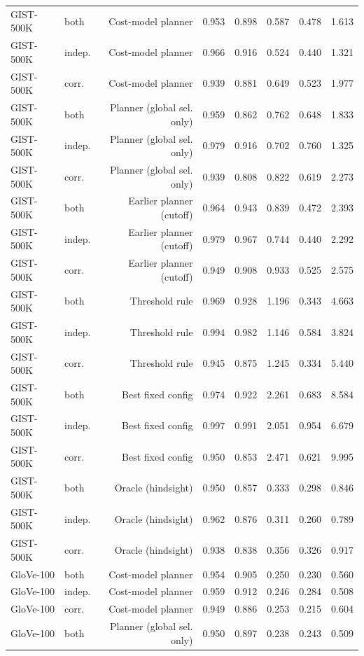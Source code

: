 \begin{table}[t]
\begin{tabular}{llrrrrrr}
GIST-500K & both & Cost-model planner & 0.953 & 0.898 & 0.587 & 0.478 & 1.613 \\
GIST-500K & indep. & Cost-model planner & 0.966 & 0.916 & 0.524 & 0.440 & 1.321 \\
GIST-500K & corr. & Cost-model planner & 0.939 & 0.881 & 0.649 & 0.523 & 1.977 \\
GIST-500K & both & Planner (global sel. only) & 0.959 & 0.862 & 0.762 & 0.648 & 1.833 \\
GIST-500K & indep. & Planner (global sel. only) & 0.979 & 0.916 & 0.702 & 0.760 & 1.325 \\
GIST-500K & corr. & Planner (global sel. only) & 0.939 & 0.808 & 0.822 & 0.619 & 2.273 \\
GIST-500K & both & Earlier planner (cutoff) & 0.964 & 0.943 & 0.839 & 0.472 & 2.393 \\
GIST-500K & indep. & Earlier planner (cutoff) & 0.979 & 0.967 & 0.744 & 0.440 & 2.292 \\
GIST-500K & corr. & Earlier planner (cutoff) & 0.949 & 0.908 & 0.933 & 0.525 & 2.575 \\
GIST-500K & both & Threshold rule & 0.969 & 0.928 & 1.196 & 0.343 & 4.663 \\
GIST-500K & indep. & Threshold rule & 0.994 & 0.982 & 1.146 & 0.584 & 3.824 \\
GIST-500K & corr. & Threshold rule & 0.945 & 0.875 & 1.245 & 0.334 & 5.440 \\
GIST-500K & both & Best fixed config & 0.974 & 0.922 & 2.261 & 0.683 & 8.584 \\
GIST-500K & indep. & Best fixed config & 0.997 & 0.991 & 2.051 & 0.954 & 6.679 \\
GIST-500K & corr. & Best fixed config & 0.950 & 0.853 & 2.471 & 0.621 & 9.995 \\
GIST-500K & both & Oracle (hindsight) & 0.950 & 0.857 & 0.333 & 0.298 & 0.846 \\
GIST-500K & indep. & Oracle (hindsight) & 0.962 & 0.876 & 0.311 & 0.260 & 0.789 \\
GIST-500K & corr. & Oracle (hindsight) & 0.938 & 0.838 & 0.356 & 0.326 & 0.917 \\
GloVe-100 & both & Cost-model planner & 0.954 & 0.905 & 0.250 & 0.230 & 0.560 \\
GloVe-100 & indep. & Cost-model planner & 0.959 & 0.912 & 0.246 & 0.284 & 0.508 \\
GloVe-100 & corr. & Cost-model planner & 0.949 & 0.886 & 0.253 & 0.215 & 0.604 \\
GloVe-100 & both & Planner (global sel. only) & 0.950 & 0.897 & 0.238 & 0.243 & 0.509 \\

\end{tabular}
\end{table}
